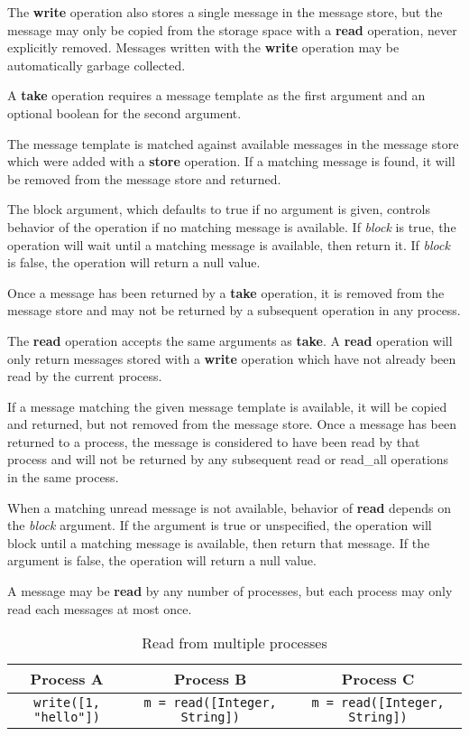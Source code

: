 The \textbf{write} operation also stores a single message in the message store, but the message may only be copied from the storage space with a \textbf{read} operation, never explicitly removed. Messages written with the \textbf{write} operation may be automatically garbage collected.

A \textbf{take} operation requires a message template as the first argument and an optional boolean for the second argument.

The message template is matched against available messages in the message store which were added with a \textbf{store} operation. If a matching message is found, it will be removed from the message store and returned.

The block argument, which defaults to true if no argument is given, controls behavior of the operation if no matching message is available. If \textit{block} is true, the operation will wait until a matching message is available, then return it. If \textit{block} is false, the operation will return a null value.

Once a message has been returned by a \textbf{take} operation, it is removed from the message store and may not be returned by a subsequent operation in any process.

The \textbf{read} operation accepts the same arguments as \textbf{take}. A \textbf{read} operation will only return messages stored with a \textbf{write} operation which have not already been read by the current process.

If a message matching the given message template is available, it will be copied and returned, but not removed from the message store. Once a message has been returned to a process, the message is considered to have been read by that process and will not be returned by any subsequent read or read\_all operations in the same process.

When a matching unread message is not available, behavior of \textbf{read} depends on the \textit{block} argument. If the argument is true or unspecified, the operation will block until a matching message is available, then return that message. If the argument is false, the operation will return a null value.

A message may be \textbf{read} by any number of processes, but each process may only read each messages at most once.

\begin{table}
\centering
\caption{Read from multiple processes}
\begin{tabular}{|c|c|c|} \hline
\textbf{Process A} & \textbf{Process B} & \textbf{Process C} \\ \hline
\texttt{write([1, "hello"])} & \texttt{m = read([Integer, String])} & \texttt{m = read([Integer, String])} \\ \hline
\end{tabular}
\label{fig:readprocesses}
\end{table}

